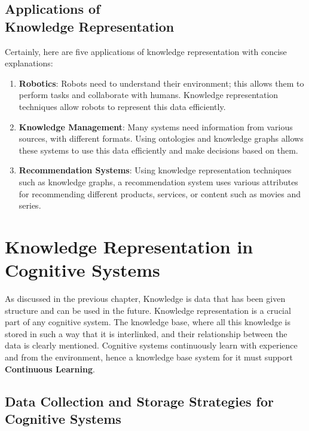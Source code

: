 \documentclass[12pt]{report}
\begin{document}
\section[Applications of Knowledge Representation]{Applications of \\Knowledge Representation}

Certainly, here are five applications of knowledge representation with concise
explanations:

\begin{enumerate}
  \item \textbf{Robotics}: Robots need to understand their environment; this
    allows them to perform tasks and collaborate with humans. Knowledge
    representation techniques allow robots to represent this data efficiently.

  \item \textbf{Knowledge Management}: Many systems need information from
    various sources, with different formats. Using ontologies and knowledge
    graphs allows these systems to use this data efficiently and make decisions
    based on them.

  \item \textbf{Recommendation Systems}: Using knowledge representation
    techniques such as knowledge graphs, a recommendation system uses various
    attributes for recommending different products, services, or content such
    as movies and series.
\end{enumerate}

\chapter{Knowledge Representation in Cognitive Systems}

As discussed in the previous chapter, Knowledge is data that has been given
structure and can be used in the future. Knowledge representation is a crucial
part of any cognitive system. The knowledge base, where all this knowledge is
stored in such a way that it is interlinked, and their relationship between the
data is clearly mentioned. Cognitive systems continuously learn with experience
and from the environment, hence a knowledge base system for it must support
\textbf{Continuous Learning}.

\section{Data Collection and Storage Strategies for Cognitive Systems}
\end{document}
